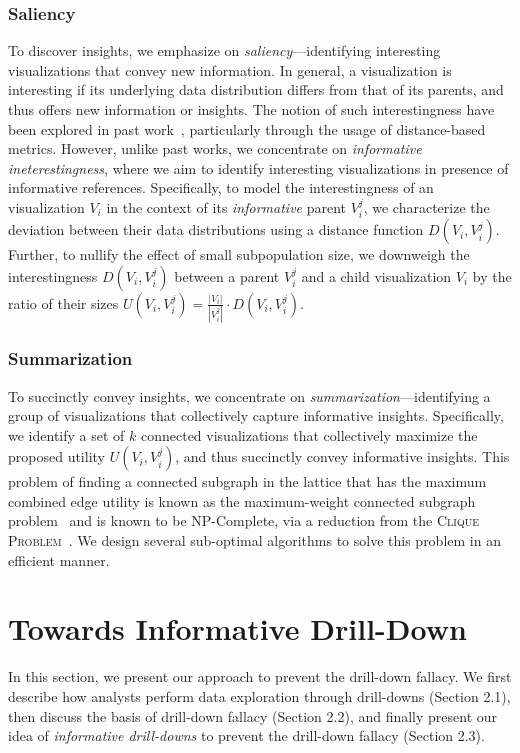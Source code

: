 \subsubsection{Saliency}
To discover insights, we emphasize on \emph{saliency}---identifying interesting visualizations that convey new information. In general, a visualization is interesting if its underlying data distribution differs from that of its parents, and thus offers new information or insights. The notion of such interestingness have been explored in past work~\cite{Vartak2015,Correll2016,Itti2009}, particularly through the usage of distance-based metrics. However, unlike past works, we concentrate on \emph{informative ineterestingness}, where we aim to identify interesting visualizations in presence of informative references. Specifically, to model the interestingness of an visualization $V_i$ in the context of its \emph{informative} parent $V_i^j$, we characterize the deviation between their data distributions using a distance function $D(V_i, V_i^j)$. Further, to nullify the effect of small subpopulation size, we downweigh the interestingness $D(V_i, V_i^j)$ between a parent $V_i^j$ and a child visualization $V_i$ by the ratio of their sizes  $U(V_i, V_i^j) = \frac{|V_i|}{|V_i^{j}|} \cdot D(V_i, V_i^j)$.

\subsubsection{Summarization}
To succinctly convey insights, we concentrate on \emph{summarization}---identifying a group of visualizations that collectively capture informative insights. Specifically, we identify a set of $k$ connected visualizations that collectively maximize the proposed utility $U(V_i, V_i^j)$, and thus succinctly convey informative insights. This problem of finding a connected subgraph in the lattice that has the maximum combined edge utility is known as the maximum-weight connected subgraph problem~\cite{ErnstAlthaus2009} and is known to be NP-Complete, via a reduction from the \textsc{Clique Problem}~\cite{Parameswaran2010}. We design several sub-optimal algorithms to solve this problem in an efficient manner.


\iffalse
\section{Towards Informative Drill-Down\label{sec:datamodel}}
\par In this section, we present our approach to prevent the drill-down fallacy. We first describe how analysts perform data exploration through drill-downs (Section 2.1), then discuss the basis of drill-down fallacy (Section 2.2), and finally present our idea of \emph{informative drill-downs} to prevent the drill-down fallacy (Section 2.3).

